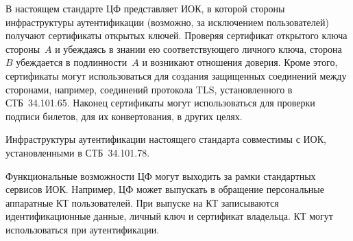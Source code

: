 В настоящем стандарте ЦФ представляет ИОК, в которой стороны инфраструктуры 
аутентификации (возможно, за исключением пользователей) получают сертификаты 
открытых ключей. 
%
Проверяя сертификат открытого ключа стороны~$A$ и убеждаясь в знании ею 
соответствующего личного ключа, сторона~$B$ убеждается в подлинности~$A$ и
возникают отношения доверия.
%
Кроме этого, сертификаты могут использоваться для создания защищенных 
соединений между сторонами, например, соединений протокола TLS, 
установленного в СТБ~34.101.65. 
%
Наконец сертификаты могут использоваться для проверки подписи билетов, для их 
конвертования, в других целях.  

Инфраструктуры аутентификации настоящего стандарта совместимы с ИОК, 
установленными в СТБ~34.101.78.

Функциональные возможности ЦФ могут выходить за рамки стандартных сервисов ИОК. 
Например, ЦФ может выпускать в обращение персональные аппаратные КТ 
пользователей. При выпуске на КТ записываются идентификационные данные, личный 
ключ и сертификат владельца. КТ могут использоваться при аутентификации.

